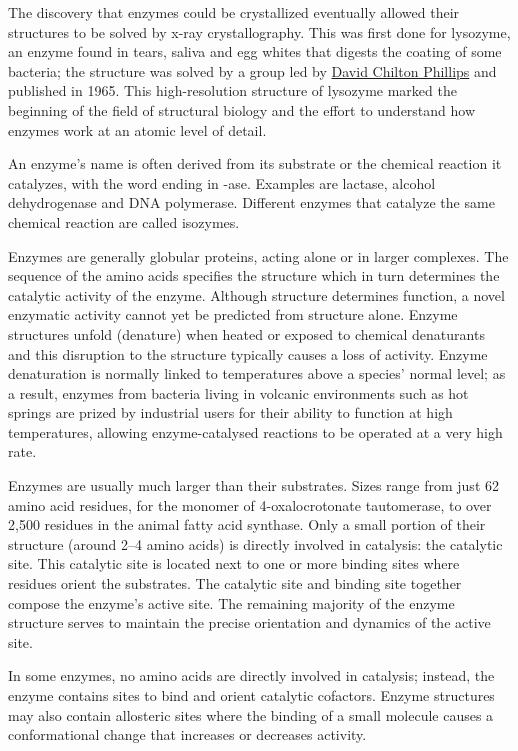 The discovery that enzymes could be crystallized eventually allowed their structures to be solved by x-ray crystallography. This was first done for lysozyme, an enzyme found in tears, saliva and egg whites that digests the coating of some bacteria; the structure was solved by a group led by \href{https://en.wikipedia.org/wiki/David_Chilton_Phillips}{David Chilton Phillips} and published in 1965. This high-resolution structure of lysozyme marked the beginning of the field of structural biology and the effort to understand how enzymes work at an atomic level of detail.

An enzyme's name is often derived from its substrate or the chemical reaction it catalyzes, with the word ending in -ase. Examples are lactase, alcohol dehydrogenase and DNA polymerase. Different enzymes that catalyze the same chemical reaction are called isozymes.

Enzymes are generally globular proteins, acting alone or in larger complexes. The sequence of the amino acids specifies the structure which in turn determines the catalytic activity of the enzyme. Although structure determines function, a novel enzymatic activity cannot yet be predicted from structure alone. Enzyme structures unfold (denature) when heated or exposed to chemical denaturants and this disruption to the structure typically causes a loss of activity. Enzyme denaturation is normally linked to temperatures above a species' normal level; as a result, enzymes from bacteria living in volcanic environments such as hot springs are prized by industrial users for their ability to function at high temperatures, allowing enzyme-catalysed reactions to be operated at a very high rate.

Enzymes are usually much larger than their substrates. Sizes range from just 62 amino acid residues, for the monomer of 4-oxalocrotonate tautomerase, to over 2,500 residues in the animal fatty acid synthase. Only a small portion of their structure (around 2--4 amino acids) is directly involved in catalysis: the catalytic site. This catalytic site is located next to one or more binding sites where residues orient the substrates. The catalytic site and binding site together compose the enzyme's active site. The remaining majority of the enzyme structure serves to maintain the precise orientation and dynamics of the active site.

In some enzymes, no amino acids are directly involved in catalysis; instead, the enzyme contains sites to bind and orient catalytic cofactors. Enzyme structures may also contain allosteric sites where the binding of a small molecule causes a conformational change that increases or decreases activity.

